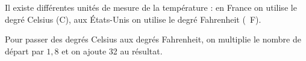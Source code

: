 \documentclass[10pt]{article}
\begin{document}
\setlength\parindent{0mm}
\pagestyle{fancy}
\thispagestyle{empty}
    
    
    




\medskip
 
Il existe différentes unités de mesure de la température : en France on utilise le degré Celsius (\degres C), aux États-Unis on utilise le degré Fahrenheit (\degres~F).

\medskip
 
Pour passer des degrés Celsius aux degrés Fahrenheit, on multiplie le nombre de départ par $1,8$ et on ajoute 32 au résultat.

\medskip
 
\end{document}
